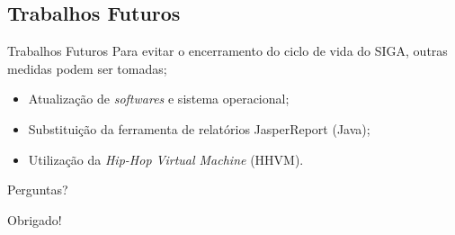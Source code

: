 \subsection*{Trabalhos Futuros}

\begin{frame}{Trabalhos Futuros}
	Para evitar o encerramento do ciclo de vida do SIGA, outras medidas podem 
	ser tomadas;
	\begin{block}{}
		\begin{itemize}
			\item Atualização de \textit{softwares} e sistema operacional;
			\item Substituição da ferramenta de relatórios JasperReport (Java);
			\item Utilização da \textit{Hip-Hop Virtual Machine} (HHVM).
		\end{itemize}
	\end{block}
\end{frame}

\begin{frame}
	\centering
	{\Huge Perguntas?}
\end{frame}

\begin{frame}
	\centering
	{\Huge Obrigado!}
\end{frame}